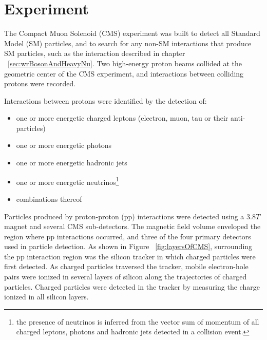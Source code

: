 \chapter{Experiment}
\label{experiment_chapter}
The Compact Muon Solenoid (CMS) experiment was built to detect all Standard Model (SM) particles, and to
search for any non-SM interactions that produce SM particles, such as the interaction described in 
chapter ~\ref{sec:wrBosonAndHeavyNu}.  Two high-energy proton beams collided at the geometric center of
the CMS experiment, and interactions between colliding protons were recorded.

Interactions between protons were identified by the detection of:
\begin{itemize}
	\item one or more energetic charged leptons (electron, muon, tau or their anti-particles)
	\item one or more energetic photons
	\item one or more energetic hadronic jets
	\item one or more energetic neutrinos\footnote{the presence of neutrinos is inferred from the vector sum of momentum of all charged leptons, photons and hadronic jets detected in a collision event.}
	\item combinations thereof
\end{itemize}
Particles produced by proton-proton (pp) interactions were detected using a 3.8$\unit{T}$ magnet and several CMS sub-detectors.  
The magnetic field volume enveloped the region where pp interactions occurred, and three of the four primary
detectors used in particle detection.  As shown in Figure ~\ref{fig:layersOfCMS}, surrounding the pp interaction
region was the silicon tracker in which charged particles were first detected.  As charged particles traversed
the tracker, mobile electron-hole pairs were ionized in several layers of silicon along the trajectories of charged
particles.  Charged particles were detected in the tracker by measuring the charge ionized in all silicon layers.

